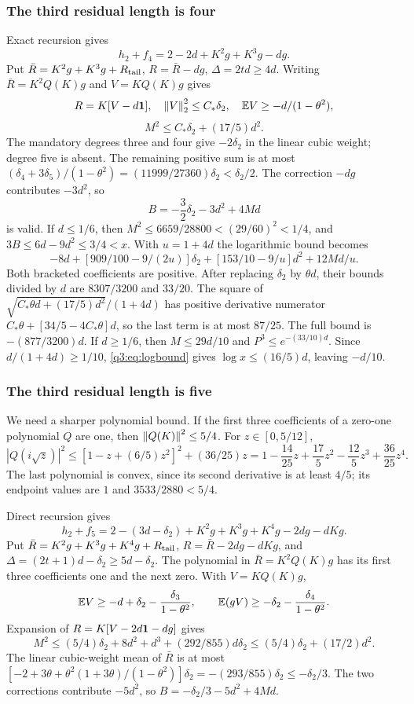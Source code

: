 \subsubsection{The third residual length is four}
Exact recursion gives
\[
 h_2+f_4=2-2d+K^2g+K^3g-dg.
\]
Put $\bar R=K^2g+K^3g+R_{\rm tail}$, $R=\bar R-dg$, $\Delta=2td\ge4d$. Writing $\bar R=K^2Q(K)g$ and $V=KQ(K)g$ gives
\[
 R=K[V-d\mathbf1],\quad
 \left\lVert V\right\rVert_2^2\le C_*\delta_{2},\quad \mathbb E V\ge-d/(1-\theta^2),
\]
\[
 M^2\le C_*\delta_{2}+(17/5)d^2 .
\]
The mandatory degrees three and four give $-2\delta_{2}$ in the linear cubic weight; degree five is absent. The remaining positive sum is at most
$(\delta_{4}+3\delta_{5})/(1-\theta^2)=(11999/27360)\delta_{2}<\delta_{2}/2$. The correction $-dg$ contributes $-3d^2$, so
\[
 B=-\frac32\delta_{2}-3d^2+4Md
\]
is valid.
If $d\le1/6$, then $M^2\le6659/28800<(29/60)^2<1/4$, and $3B\le6d-9d^2\le3/4<x$. With $u=1+4d$ the logarithmic bound becomes
\[
 -8d+[909/100-9/(2u)]\delta_{2}+
 [153/10-9/u]d^2+12Md/u.
\]
Both bracketed coefficients are positive. After replacing $\delta_{2}$ by $\theta d$, their bounds divided by $d$ are $8307/3200$ and $33/20$. The square of
$\sqrt{C_*\theta d+(17/5)d^2}/(1+4d)$ has positive derivative numerator $C_*\theta+[34/5-4C_*\theta]d$, so the last term is at most $87/25$. The full bound is $-(877/3200)d$.
If $d\ge1/6$, then $M\le29d/10$ and $P^3\le e^{-(33/10)d}$. Since $d/(1+4d)\ge1/10$, \eqref{q3:eq:logbound} gives $\log x\le(16/5)d$, leaving $-d/10$.

\subsubsection{The third residual length is five}
We need a sharper polynomial bound. If the first three coefficients of a zero-one polynomial $Q$ are one, then $\left\lVert Q(K)\right\rVert^2\le5/4$. For $z\in[0,5/12]$,
\[
 |Q(i\sqrt z)|^2\le[1-z+(6/5)z^2]^2+(36/25)z
 =1-\frac{14}{25}z+\frac{17}5z^2-\frac{12}5z^3+\frac{36}{25}z^4.
\]
The last polynomial is convex, since its second derivative is at least $4/5$; its endpoint values are $1$ and $3533/2880<5/4$.

Direct recursion gives
\[
 h_2+f_5=2-(3d-\delta_{2})+K^2g+K^3g+K^4g-2dg-dKg.
\]
Put $\bar R=K^2g+K^3g+K^4g+R_{\rm tail}$, $R=\bar R-2dg-dKg$, and
$\Delta=(2t+1)d-\delta_{2}\ge5d-\delta_{2}$. The polynomial in $\bar R=K^2Q(K)g$ has its first three coefficients one and the next zero. With $V=KQ(K)g$,
\[
 \mathbb E V\ge-d+\delta_{2}-\frac{\delta_{3}}{1-\theta^2},\qquad
 \mathbb E(gV)\ge-\delta_{2}-\frac{\delta_{4}}{1-\theta^2}.
\]
Expansion of $R=K[V-2d\mathbf1-dg]$ gives
\[
 M^2\le(5/4)\delta_{2}+8d^2+d^3+(292/855)d\delta_{2}
 \le(5/4)\delta_{2}+(17/2)d^2.
\]
The linear cubic-weight mean of $\bar R$ is at most
$[-2+3\theta+\theta^2(1+3\theta)/(1-\theta^2)]\delta_{2}
=-(293/855)\delta_{2}\le-\delta_{2}/3$.
The two corrections contribute $-5d^2$, so $B=-\delta_{2}/3-5d^2+4Md$.

